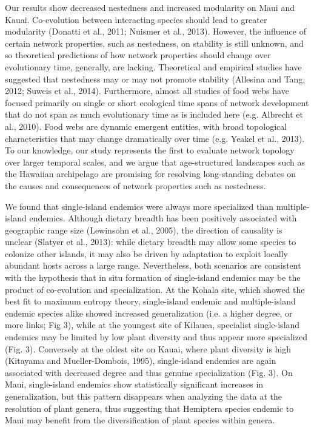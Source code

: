 Our results show decreased nestedness and increased modularity on Maui
and Kauai. Co-evolution between interacting species should lead to
greater modularity (Donatti et al., 2011; Nuismer et al.,
2013). However, the influence of certain network properties, such as
nestedness, on stability is still unknown, and so theoretical
predictions of how network properties should change over evolutionary
time, generally, are lacking. Theoretical and empirical studies have
suggested that nestedness may or may not promote stability (Allesina
and Tang, 2012; Suweis et al., 2014). Furthermore, almost all studies
of food webs have focused primarily on single or short ecological time
spans of network development that do not span as much evolutionary
time as is included here (e.g. Albrecht et al., 2010). Food webs are
dynamic emergent entities, with broad topological characteristics that
may change dramatically over time (e.g. Yeakel et al., 2013). To our
knowledge, our study represents the first to evaluate network topology
over larger temporal scales, and we argue that age-structured
landscapes such as the Hawaiian archipelago are promising for
resolving long-standing debates on the causes and consequences of
network properties such as nestedness.

We found that single-island endemics were always more specialized than
multiple-island endemics. Although dietary breadth has been positively
associated with geographic range size (Lewinsohn et al., 2005), the
direction of causality is unclear (Slatyer et al., 2013): while
dietary breadth may allow some species to colonize other islands, it
may also be driven by adaptation to exploit locally abundant hosts
across a large range. Nevertheless, both scenarios are consistent with
the hypothesis that in situ formation of single-island endemics may be
the product of co-evolution and specialization. At the Kohala site,
which showed the best fit to maximum entropy theory, single-island
endemic and multiple-island endemic species alike showed increased
generalization (i.e. a higher degree, or more links; Fig 3), while at
the youngest site of Kilauea, specialist single-island endemics may be
limited by low plant diversity and thus appear more specialized
(Fig. 3). Conversely at the oldest site on Kauai, where plant
diversity is high (Kitayama and Mueller-Dombois, 1995), single-island
endemics are again associated with decreased degree and thus genuine
specialization (Fig. 3). On Maui, single-island endemics show
statistically significant increases in generalization, but this
pattern disappears when analyzing the data at the resolution of plant
genera, thus suggesting that Hemiptera species endemic to Maui may
benefit from the diversification of plant species within genera.


